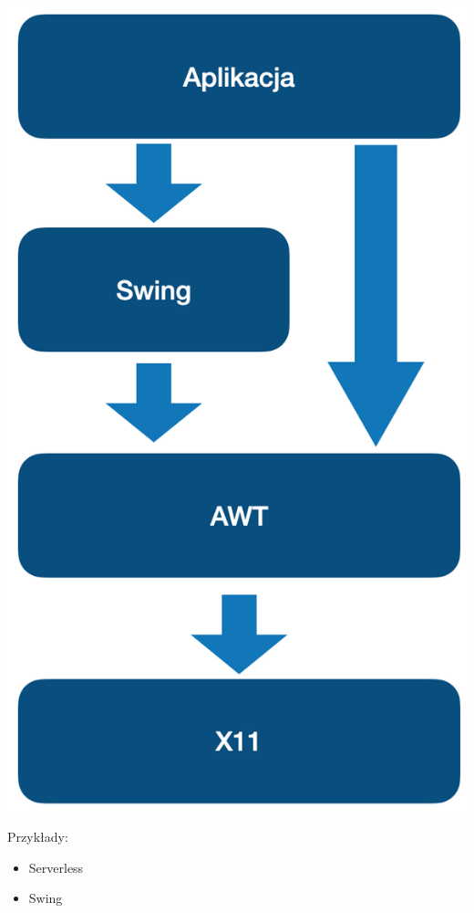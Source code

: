 \documentclass[12pt]{article}
\begin{document}
            \begin{center}
                \includegraphics[scale=0.30]{patterns/swing.png}
            \end{center}

            Przykłady:
            \begin{itemize}
                \item Serverless
                \item Swing
            \end{itemize}
\end{document}
